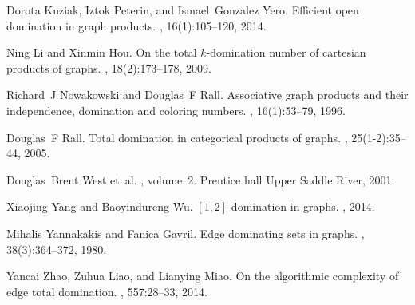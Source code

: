 \documentclass[A4,12pt]{article}
\theoremstyle{definition}
\theoremstyle{remark}
\begin{document}
\begin{thebibliography}{10}
	Dorota Kuziak, Iztok Peterin, and Ismael~Gonzalez Yero.
	\newblock Efficient open domination in graph products.
	,
	16(1):105--120, 2014.
	
	Ning Li and Xinmin Hou.
	\newblock On the total $k$-domination number of cartesian products of graphs.
	, 18(2):173--178, 2009.
	
	Richard~J Nowakowski and Douglas~F Rall.
	\newblock Associative graph products and their independence, domination and
	coloring numbers.
	, 16(1):53--79, 1996.
	
	Douglas~F Rall.
	\newblock Total domination in categorical products of graphs.
	, 25(1-2):35--44, 2005.
	
	Douglas~Brent West et~al.
	, volume~2.
	\newblock Prentice hall Upper Saddle River, 2001.
	
	Xiaojing Yang and Baoyindureng Wu.
	\newblock $[1, 2]$-domination in graphs.
	, 2014.
	
	Mihalis Yannakakis and Fanica Gavril.
	\newblock Edge dominating sets in graphs.
	, 38(3):364--372, 1980.
	
	Yancai Zhao, Zuhua Liao, and Lianying Miao.
	\newblock On the algorithmic complexity of edge total domination.
	, 557:28--33, 2014.
	
\end{thebibliography}
\end{document}
